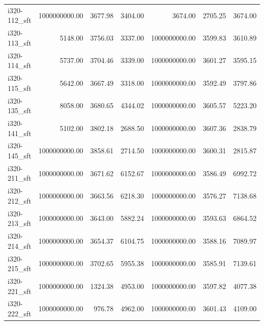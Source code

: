 \begin{tabular}{lrrrrrr}
i320-112\_sft &         1000000000.00 &                   3677.98 &             3404.00 &            3674.00 &                2705.25 &          3674.00 \\
i320-113\_sft &               5148.00 &                   3756.03 &             3337.00 &      1000000000.00 &                3599.83 &          3610.89 \\
i320-114\_sft &               5737.00 &                   3704.46 &             3339.00 &      1000000000.00 &                3601.27 &          3595.15 \\
i320-115\_sft &               5642.00 &                   3667.49 &             3318.00 &      1000000000.00 &                3592.49 &          3797.86 \\
i320-135\_sft &               8058.00 &                   3680.65 &             4344.02 &      1000000000.00 &                3605.57 &          5223.20 \\
i320-141\_sft &               5102.00 &                   3802.18 &             2688.50 &      1000000000.00 &                3607.36 &          2838.79 \\
i320-145\_sft &         1000000000.00 &                   3858.61 &             2714.50 &      1000000000.00 &                3600.31 &          2815.87 \\
i320-211\_sft &         1000000000.00 &                   3671.62 &             6152.67 &      1000000000.00 &                3586.49 &          6992.72 \\
i320-212\_sft &         1000000000.00 &                   3663.56 &             6218.30 &      1000000000.00 &                3576.27 &          7138.68 \\
i320-213\_sft &         1000000000.00 &                   3643.00 &             5882.24 &      1000000000.00 &                3593.63 &          6864.52 \\
i320-214\_sft &         1000000000.00 &                   3654.37 &             6104.75 &      1000000000.00 &                3588.16 &          7089.97 \\
i320-215\_sft &         1000000000.00 &                   3702.65 &             5955.38 &      1000000000.00 &                3585.91 &          7139.61 \\
i320-221\_sft &         1000000000.00 &                   1324.38 &             4953.00 &      1000000000.00 &                3597.82 &          4077.38 \\
i320-222\_sft &         1000000000.00 &                    976.78 &             4962.00 &      1000000000.00 &                3601.43 &          4109.00 \\

\end{tabular}

